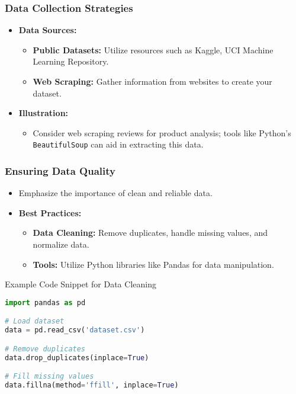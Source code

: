 \documentclass[aspectratio=169]{beamer}
\begin{document}
\begin{frame}
    \frametitle{Data Collection Strategies}
    \begin{itemize}
        \item \textbf{Data Sources:}
            \begin{itemize}
                \item \textbf{Public Datasets:} Utilize resources such as Kaggle, UCI Machine Learning Repository.
                \item \textbf{Web Scraping:} Gather information from websites to create your dataset.
            \end{itemize}
        \item \textbf{Illustration:}
            \begin{itemize}
                \item Consider web scraping reviews for product analysis; tools like Python's \texttt{BeautifulSoup} can aid in extracting this data.
            \end{itemize}
    \end{itemize}
\end{frame}

\begin{frame}[fragile]
    \frametitle{Ensuring Data Quality}
    \begin{itemize}
        \item Emphasize the importance of clean and reliable data.
        \item \textbf{Best Practices:}
            \begin{itemize}
                \item \textbf{Data Cleaning:} Remove duplicates, handle missing values, and normalize data.
                \item \textbf{Tools:} Utilize Python libraries like Pandas for data manipulation.
            \end{itemize}
    \end{itemize}
    \begin{block}{Example Code Snippet for Data Cleaning}
    \begin{lstlisting}[language=Python]
import pandas as pd

# Load dataset
data = pd.read_csv('dataset.csv')

# Remove duplicates
data.drop_duplicates(inplace=True)

# Fill missing values
data.fillna(method='ffill', inplace=True)
    \end{lstlisting}
    \end{block}
\end{frame}
\end{document}
